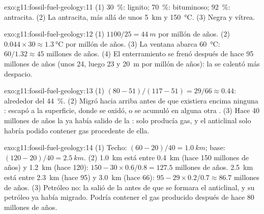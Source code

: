 \begin{solution}{exo:g11:fossil-fuel-geology:11}
(1) \qty{30}{\percent}: lignito; \qty{70}{\percent}:  bituminoso;
\qty{92}{\percent}: antracita. (2) La antracita, más allá de unos
\qty{5}{km} y \qty{150}{\degreeCelsius}. (3) Negra y vítrea.
\end{solution}

\begin{solution}{exo:g11:fossil-fuel-geology:12}
(1) $1100/25 = \qty{44}{m}$ por millón de años. (2) $0.044 \times 30
\approx \qty{1.3}{\degreeCelsius}$ por millón de años. (3) La ventana abarca
\qty{60}{\degreeCelsius}: $60/1.32 \approx 45$ millones de años. (4) El
enterramiento se frenó después de hace 95 millones de años (unos 24, luego 23
y \qty{20}{m} por millón de años): la  se calentó más despacio.
\end{solution}

\begin{solution}{exo:g11:fossil-fuel-geology:13}
(1) $(80 - 51)/(117 - 51) = 29/66 \approx 0.44$: alrededor del \qty{44}{\percent}.
(2) Migró hacia arriba antes de que existiera encima ninguna : escapó a
la superficie, donde se oxidó, o se acumuló en alguna otra . (3) Hace 40
millones de años la  ya había salido de la : solo producía gas, y el anticlinal solo habría podido contener gas
procedente de ella.
\end{solution}

\begin{solution}{exo:g11:fossil-fuel-geology:14}
(1) Techo: $(60 - 20)/40 = \qty{1.0}{km}$; base: $(120 - 20)/40 =
\qty{2.5}{km}$. (2) \qty{1.0}{km} está entre \qty{0.4}{km} (hace 150 millones
de años) y \qty{1.2}{km} (hace 120): $150 - 30 \times 0.6/0.8 = 127.5$
millones de años. \qty{2.5}{km} está entre \qty{2.3}{km} (hace 95) y
\qty{3.0}{km} (hace 66): $95 - 29 \times 0.2/0.7 \approx 86.7$ millones de
años. (3) Petróleo no: la  salió de la 
antes de que se formara el anticlinal, y su petróleo ya había migrado. Podría
contener el gas producido después de hace 80 millones de años.
\end{solution}

